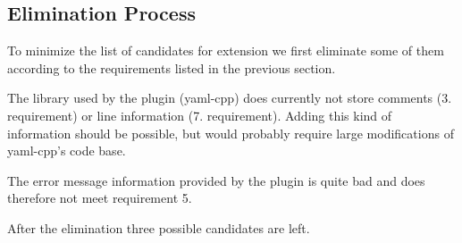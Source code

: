 \subsection{Elimination Process}

To minimize the list of candidates for extension we first eliminate some of them according to the requirements listed in the previous section.

\begin{description}[style=multiline, leftmargin=2cm, font=\bfseries]
  \item[YAML CPP] The library used by the plugin (yaml-cpp) does currently not store comments (3. requirement) or line information (7. requirement). Adding this kind of information should be possible, but would probably require large modifications of yaml-cpp’s code base.

  \item[YAy PEG] The error message information provided by the plugin is quite bad and does therefore not meet requirement 5.
\end{description}

After the elimination three possible candidates are left.


